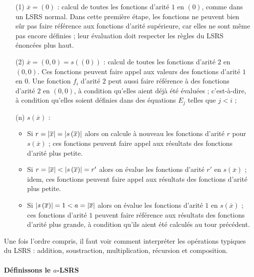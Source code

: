 		\begin{itemize}[itemsep=-1mm]
			\item[(1)] 	
					$\overline{x} = (0)$ : calcul de toutes les fonctions d'arité $1$ en $(0)$, comme dans un LSRS normal. Dans cette première étape, les fonctions ne peuvent bien sûr pas faire référence aux fonctions d'arité supérieure, car elles ne sont même pas encore définies ; leur évaluation doit respecter les règles du LSRS énoncées plus haut. 
					
			\item[(2)] 
					$\overline{x} = (0,0) = s\left( \left( 0 \right)\right)$ : calcul de toutes les fonctions d'arité $2$ en $(0,0)$. Ces fonctions peuvent faire appel aux valeurs des fonctions d'arité $1$ en $0$. Une fonction $f_i$ d'arité $2$ peut aussi faire référence à des fonctions d'arité $2$ en $(0,0)$, à condition qu'elles aient déjà été évaluées ; c'est-à-dire, à condition qu'elles soient définies dans des équations $E_j$ telles que $j<i$ ;
					
			\item[(n)]   	
					$s\left(\overline{x}\right)$ :
					\begin{itemize}[itemsep=-1mm]
						\item 	Si $r = \left|\overline{x}\right| = \left|s\left(\overline{x}\right)\right|$ alors on calcule à nouveau les fonctions d'arité $r$ pour $s\left(\overline{x}\right)$ ; ces fonctions peuvent faire appel aux résultats des fonctions d'arité plus petite. 
						\item 	Si $r = \left|\overline{x}\right| < \left|s\left(\overline{x}\right)\right| = r'$ alors on évalue les fonctions d'arité $r'$ en $s\left(\overline{x}\right)$ ; idem, ces fonctions peuvent faire appel aux résultats des fonctions d'arité plus petite.
						\item 	Si $\left|s\left(\overline{x}\right)\right| = 1 < a = \left|\overline{x}\right|$ alors on évalue les fonctions d'arité $1$ en $s\left(\overline{x}\right)$ ; ces fonctions d'arité $1$ peuvent faire référence aux résultats des fonctions d'arité plus grande, à condition qu'ils aient été calculés au tour précédent. 
					\end{itemize}
		\end{itemize}
		
		Une fois l'ordre compris, il faut voir comment interpréter les opérations typiques du LSRS : addition, soustraction, multiplication, récursion et composition.
	
	
			\paragraph{Définissons le $a$-LSRS}
			
